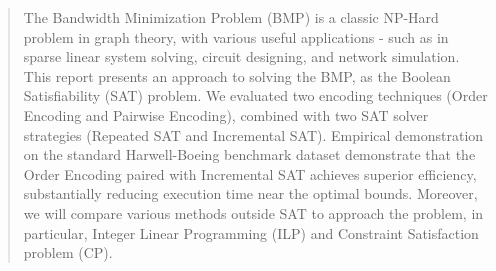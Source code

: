 
\begin{abstract}
The Bandwidth Minimization Problem (BMP) is a classic NP-Hard problem in graph theory, with various useful applications - such as in sparse linear system solving, circuit designing, and network simulation. This report presents an approach to solving the BMP, as the Boolean Satisfiability (SAT) problem. We evaluated two encoding techniques (Order Encoding and Pairwise Encoding), combined with two SAT solver strategies (Repeated SAT and Incremental SAT). Empirical demonstration on the standard Harwell-Boeing benchmark dataset demonstrate that the Order Encoding paired with Incremental SAT achieves superior efficiency, substantially reducing execution time near the optimal bounds. Moreover, we will compare various methods outside SAT to approach the problem, in particular, Integer Linear Programming (ILP) and Constraint Satisfaction problem (CP).
\end{abstract}
